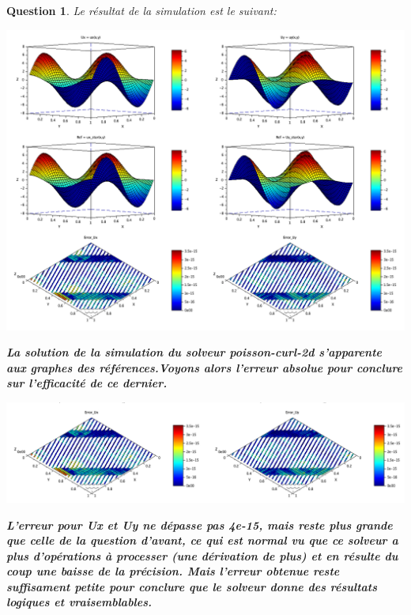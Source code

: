 \documentclass[a4paper,10pt]{article}
\newtheorem{question}{Question}
\begin{document}
\begin{question}
Le résultat de la simulation est le suivant:
\begin{center}
\includegraphics[scale=0.35]{poisson_error_curl.png}
\label{fig1}
\end{center}
\vskip 0.5cm
\textbf{La solution de la simulation du solveur poisson-curl-2d s'apparente aux graphes des références.Voyons alors l'erreur absolue pour conclure sur l'efficacité de ce dernier.}
\vskip 1cm
\begin{center}
\includegraphics[scale=0.35]{erreurs_curl.png}
\label{fig1}
\end{center}
\vskip 0.5cm
\textbf{L'erreur pour Ux et Uy ne dépasse pas 4e-15, mais reste plus grande que celle de la question d'avant, ce qui est normal vu que ce solveur a plus d'opérations à  processer (une dérivation de plus) et en résulte du coup une baisse de la précision. Mais l'erreur obtenue reste suffisament petite pour conclure que le solveur donne des résultats logiques et vraisemblables.}
\vskip 1cm
\end{question}
\vskip 1cm
\end{document}
